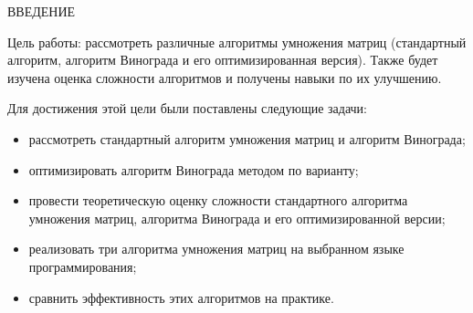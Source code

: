 \begin{center}
    \MakeUppercase{\large Введение}
\end{center}

Цель работы: рассмотреть различные алгоритмы умножения матриц (стандартный алгоритм, алгоритм Винограда и его оптимизированная версия). Также будет изучена оценка сложности алгоритмов и получены навыки по их улучшению.

\vspace{0.25cm}
Для достижения этой цели были поставлены следующие задачи:

\begin{itemize}

\item рассмотреть стандартный алгоритм умножения матриц и алгоритм Винограда;

\item оптимизировать алгоритм Винограда методом по варианту;

\item провести теоретическую оценку сложности стандартного алгоритма умножения матриц, алгоритма Винограда и его оптимизированной версии;

\item реализовать три алгоритма умножения матриц на выбранном языке программирования;

\item сравнить эффективность этих алгоритмов на практике.

\end{itemize}

\newpage